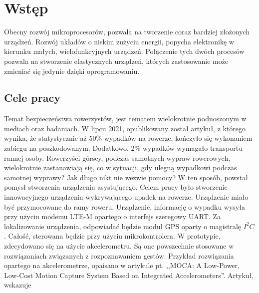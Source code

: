 \chapter{Wstęp}
\label{cha:wstep}

Obecny rozwój mikroprocesorów, pozwala na tworzenie coraz bardziej złożonych urządzeń. Rozwój układów o niskim zużyciu energii, popycha elektronikę w kierunku małych, wielofunkcyjnych urządzeń. Połączenie tych dwóch procesów pozwala na stworzenie elastycznych urządzeń, których zastosowanie może zmieniać się jedynie dzięki oprogramowaniu.


\section{Cele pracy}
\label{sec:celePracy}
Temat bezpieczeństwa rowerzystów, jest tematem wielokrotnie podnoszonym w mediach oraz badaniach. W lipcu 2021, opublikowany został artykuł, z którego wynika, że statystycznie aż 50\% wypadków na rowerze, kończyło się wykonaniem zabiegu na poszkodowanym. Dodatkowo, 2\% wypadków wymagało transportu rannej osoby.\cite{collisions}
Rowerzyści górscy, podczas samotnych wypraw rowerowych, wielokrotnie zastanawiają się, co w sytuacji, gdy ulegną wypadkowi podczas samotnej wyprawy?
Jak długo nikt nie wezwie pomocy? W ten sposób, powstał pomysł stworzenia urządzenia asystującego.
\newline
Celem pracy było stworzenie innowacyjnego urządzenia wykrywającego upadek na rowerze. Urządzenie miało być przymocowane do ramy roweru. Urządzenie, informację o wypadku wysyła przy użyciu modemu LTE-M opartego o interfejs szeregowy UART. Za lokalizowanie urządzenia, odpowiadać będzie moduł GPS oparty o magistralę $I^{2}C$. Całość, sterowana będzie przy użyciu mikrokontrolera. W prototypie, zdecydowano się na użycie akcelerometru. Są one powszechnie stosowane w rozwiązaniach związanych z rozpoznawaniem gestów. Przykład rozwiązania opartego na akcelerometrze, opaisano w artykule pt. ,,MOCA: A Low-Power, Low-Cost Motion Capture System
Based on Integrated Accelerometers''.\cite{moca_acc} Artykuł, wskazuje

